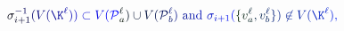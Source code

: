 \documentclass[12pt]{article}
\begin{document}
\makeatletter
\renewcommand*{\@textcolor}[3]{%
  \protect\leavevmode
  \begingroup
    \color#1{#2}#3%
  \endgroup
}
\makeatother
\begin{displaymath}
\mathcolor[RGB]{0,0,15}{\sigma} _ { \mathcolor[RGB]{0,0,30}{i} \mathcolor[RGB]{0,0,45}{+} \mathcolor[RGB]{0,0,60}{1} } ^ { \mathcolor[RGB]{0,0,75}{-} \mathcolor[RGB]{0,0,90}{1} } \mathcolor[RGB]{0,0,105}{(} \mathcolor[RGB]{0,0,120}{V} \mathcolor[RGB]{0,0,135}{(} \mathcolor[RGB]{0,0,150}{\K} ^ { \mathcolor[RGB]{0,0,165}{\ell} } \mathcolor[RGB]{0,0,180}{)} \mathcolor[RGB]{0,0,195}{)} \mathcolor[RGB]{0,0,210}{\subset} \mathcolor[RGB]{0,0,225}{V} \mathcolor[RGB]{0,0,240}{(} \mathcal { \mathcolor[RGB]{0,0,255}{P} } _ { \mathcolor[RGB]{0,15,0}{a} } ^ { \mathcolor[RGB]{0,15,15}{\ell} } \mathcolor[RGB]{0,15,30}{)} \mathcolor[RGB]{0,15,45}{\cup} \mathcolor[RGB]{0,15,60}{V} \mathcolor[RGB]{0,15,75}{(} \mathcal { \mathcolor[RGB]{0,15,90}{P} } _ { \mathcolor[RGB]{0,15,105}{b} } ^ { \mathcolor[RGB]{0,15,120}{\ell} } \mathcolor[RGB]{0,15,135}{)} \mathrm { ~ \mathcolor[RGB]{0,15,150}{a} \mathcolor[RGB]{0,15,165}{n} \mathcolor[RGB]{0,15,180}{d} ~ } \mathcolor[RGB]{0,15,195}{\sigma} _ { \mathcolor[RGB]{0,15,210}{i} \mathcolor[RGB]{0,15,225}{+} \mathcolor[RGB]{0,15,240}{1} } \mathcolor[RGB]{0,15,255}{(} \mathcolor[RGB]{0,30,0}{\{} \mathcolor[RGB]{0,30,15}{v} _ { \mathcolor[RGB]{0,30,30}{a} } ^ { \mathcolor[RGB]{0,30,45}{\ell} } \mathcolor[RGB]{0,30,60}{,} \mathcolor[RGB]{0,30,75}{v} _ { \mathcolor[RGB]{0,30,90}{b} } ^ { \mathcolor[RGB]{0,30,105}{\ell} } \mathcolor[RGB]{0,30,120}{\}} \mathcolor[RGB]{0,30,135}{)} \mathcolor[RGB]{0,30,150}{\not\in} \mathcolor[RGB]{0,30,165}{V} \mathcolor[RGB]{0,30,180}{(} \mathcolor[RGB]{0,30,195}{\K} ^ { \mathcolor[RGB]{0,30,210}{\ell} } \mathcolor[RGB]{0,30,225}{)} \mathcolor[RGB]{0,30,240}{,}
\end{displaymath}
\end{document}
